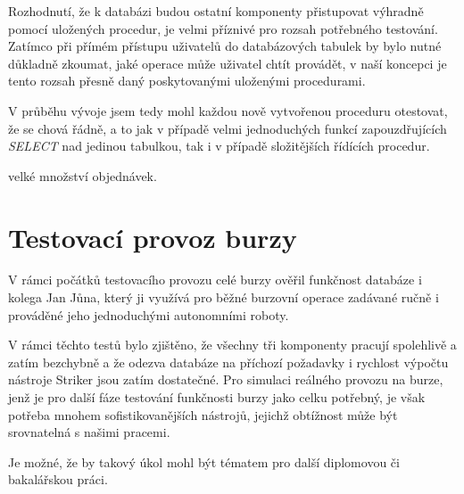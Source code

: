 \documentclass[thesis=M,czech]{FITthesis}[2012/06/26]
\begin{document}
Rozhodnutí, že k databázi budou ostatní komponenty přistupovat výhradně pomocí uložených procedur, je velmi 
příznivé pro rozsah potřebného testování. Zatímco při přímém přístupu uživatelů do databázových tabulek by bylo 
nutné důkladně zkoumat, jaké operace může uživatel chtít provádět, v naší koncepci je tento rozsah přesně daný 
poskytovanými uloženými procedurami. 

V průběhu vývoje jsem tedy mohl každou nově vytvořenou proceduru otestovat, že se chová řádně, a to jak 
v případě velmi jednoduchých funkcí zapouzdřujících \textit{SELECT} nad jedinou tabulkou, tak i v případě 
složitějších řídících procedur.

velké množství objednávek.



\section{Testovací provoz burzy}

V rámci počátků testovacího provozu celé burzy ověřil funkčnost databáze i kolega Jan Jůna, který ji 
využívá pro běžné burzovní operace zadávané ručně i prováděné jeho jednoduchými autonomními roboty.

V rámci těchto testů bylo zjištěno, že všechny tři komponenty pracují spolehlivě a zatím bezchybně a
že odezva databáze na příchozí požadavky i rychlost výpočtu nástroje Striker 
jsou zatím dostatečné. Pro simulaci reálného provozu na burze, jenž je pro další fáze testování funkčnosti 
burzy jako celku potřebný, je však potřeba mnohem sofistikovanějších nástrojů, jejichž obtížnost může 
být srovnatelná s našimi pracemi. 

Je možné, že by takový úkol mohl být tématem pro další diplomovou či bakalářskou práci.


\end{document}
